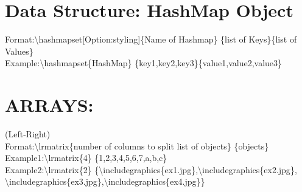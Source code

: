 \documentclass[a4paper]{article}
\begin{document}
\section{ Data Structure: HashMap Object}
Format:{\textbackslash}hashmapset[Option:styling]{\{}Name of Hashmap{\} }{\{}list of Keys{\}}{\{}list of Values{\}}\\
Example:{\textbackslash}hashmapset{\{}HashMap{\} }{\{}key1,key2,key3{\}}{\{}value1,value2,value3{\}}\newline \\
\begin{adjustbox}{width=0.5\paperwidth,center,keepaspectratio}
\end{adjustbox}

\newpage

\section{ARRAYS:}
(Left-Right)\\ 
Format:{\textbackslash}lrmatrix{\{}number of columns to split list of objects{\} }{\{}objects{\}}\\
Example1:{\textbackslash}lrmatrix{\{}4{\} }{\{}1,2,3,4,5,6,7,a,b,c{\}}\\
Example2:{\textbackslash}lrmatrix{\{}2{\} }{\{}{\textbackslash}includegraphics{\{}ex1.jpg{\}},{\textbackslash}includegraphics{\{}ex2.jpg{\}},\\{\textbackslash}includegraphics{\{}ex3.jpg{\}},{\textbackslash}includegraphics{\{}ex4.jpg{\}}{\}}\newline
\end{document}
